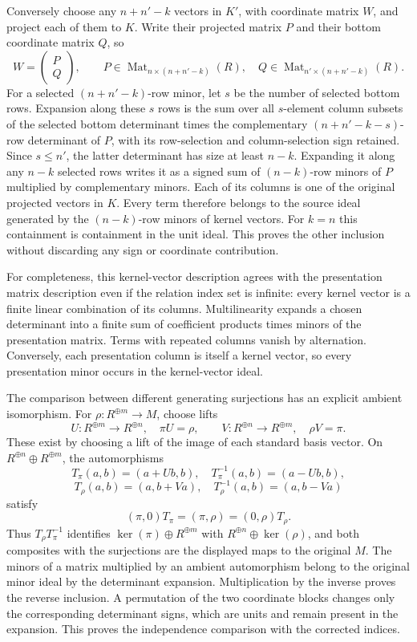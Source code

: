 \documentclass[11pt]{article}
\begin{document}
Conversely choose any \(n+n'-k\) vectors in \(K'\), with coordinate matrix \(W\), and project each of them to \(K\). Write their projected matrix \(P\) and their bottom coordinate matrix \(Q\), so \[
 W=\begin{pmatrix}P\\Q\end{pmatrix},
 \qquad P\in\operatorname{Mat}_{n\times(n+n'-k)}(R),
 \quad Q\in\operatorname{Mat}_{n'\times(n+n'-k)}(R).
\] For a selected \((n+n'-k)\)-row minor, let \(s\) be the number of selected bottom rows. Expansion along these \(s\) rows is the sum over all \(s\)-element column subsets of the selected bottom determinant times the complementary \((n+n'-k-s)\)-row determinant of \(P\), with its row-selection and column-selection sign retained. Since \(s\leq n'\), the latter determinant has size at least \(n-k\). Expanding it along any \(n-k\) selected rows writes it as a signed sum of \((n-k)\)-row minors of \(P\) multiplied by complementary minors. Each of its columns is one of the original projected vectors in \(K\). Every term therefore belongs to the source ideal generated by the \((n-k)\)-row minors of kernel vectors. For \(k=n\) this containment is containment in the unit ideal. This proves the other inclusion without discarding any sign or coordinate contribution.

For completeness, this kernel-vector description agrees with the presentation matrix description even if the relation index set is infinite: every kernel vector is a finite linear combination of its columns. Multilinearity expands a chosen determinant into a finite sum of coefficient products times minors of the presentation matrix. Terms with repeated columns vanish by alternation. Conversely, each presentation column is itself a kernel vector, so every presentation minor occurs in the kernel-vector ideal.

The comparison between different generating surjections has an explicit ambient isomorphism. For \(\rho:R^{\oplus m}\to M\), choose lifts \[
 U:R^{\oplus m}\to R^{\oplus n},\quad \pi U=\rho,\qquad
 V:R^{\oplus n}\to R^{\oplus m},\quad \rho V=\pi.
\] These exist by choosing a lift of the image of each standard basis vector. On \(R^{\oplus n}\oplus R^{\oplus m}\), the automorphisms \[
 T_\pi(a,b)=(a+Ub,b),\quad T_\pi^{-1}(a,b)=(a-Ub,b),
\] \[
 T_\rho(a,b)=(a,b+Va),\quad T_\rho^{-1}(a,b)=(a,b-Va)
\] satisfy \[
 (\pi,0)T_\pi=(\pi,\rho)=(0,\rho)T_\rho.
\] Thus \(T_\rho T_\pi^{-1}\) identifies \(\ker(\pi)\oplus R^{\oplus m}\) with \(R^{\oplus n}\oplus\ker(\rho)\), and both composites with the surjections are the displayed maps to the original \(M\). The minors of a matrix multiplied by an ambient automorphism belong to the original minor ideal by the determinant expansion. Multiplication by the inverse proves the reverse inclusion. A permutation of the two coordinate blocks changes only the corresponding determinant signs, which are units and remain present in the expansion. This proves the independence comparison with the corrected indices.
\end{document}
